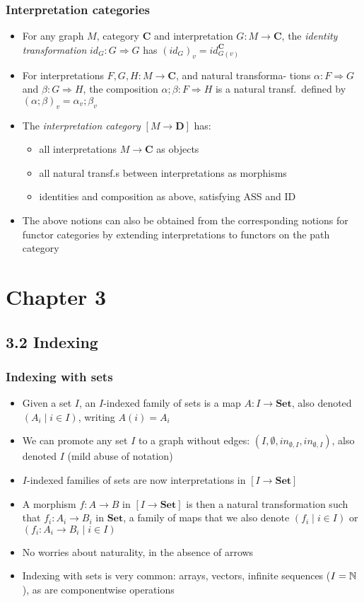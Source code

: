 \documentclass[handout]{beamer}
\newcommand{\To}{\Rightarrow}
\newcommand{\bfsf}[1]{{\boldsymbol{#1}}}
\newcommand{\Set}{\bfsf{Set}}
\newcommand{\CC}{\bfsf{C}}
\newcommand{\DD}{\bfsf{D}}
\begin{document}
\frame
  {   
    \frametitle{Interpretation categories}\label{Ch3:interpretationcats}

 \begin{itemize}[<+->]
\item For any graph $M$,  category $\CC$ and interpretation $G: M\to\CC$, the 
\emph{identity transformation} $id_G : G\To G$ has $(id_G)_v = id^\CC_{G(v)}$
\item For interpretations $F,G,H: M\to\CC$, and natural
transforma- tions $\alpha: F\To G$ and $\beta:G\To H$, the composition
$\alpha;\beta: F\To H$ is a natural transf.\ defined by 
$(\alpha;\beta)_v= \alpha_v;\beta_v$
 \item The \emph{interpretation category} $[M\to\DD]$ has:
   \begin{itemize}[<+->]
\item all interpretations $M\to\CC$ as objects 
\item all natural transf.s  between interpretations as morphisms 
\item identities and composition as above, satisfying ASS and ID
   \end{itemize}
\item The above notions can also be obtained from the corresponding
notions for functor categories by extending interpretations
to functors on the path category
 \end{itemize}

 }


\section{Chapter 3}
\subsection{3.2 Indexing}

\frame
  {   
    \frametitle{Indexing with sets}\label{Ch3:indexset}

 \begin{itemize}[<+->]
\item Given a set $I$, an $I$-indexed family of sets is a map $A : I\to \Set$,
also denoted $(A_i \mid i\in I)$,  writing $A(i)=A_i$
\item We can promote any set $I$ to a graph without edges: 
$(I,\emptyset,in_{\emptyset,I},in_{\emptyset,I})$, also denoted $I$ (mild abuse of notation)
 \item $I$-indexed families of sets are now interpretations in $[I\to \Set]$
 \item A morphism $f: A\to B$ in $[I\to \Set]$ is then a natural transformation
such that $f_i: A_i \to B_i$ in $\Set$, a family of maps that we also denote
$(f_i \mid i\in I)$ or $(f_i: A_i\to B_i \mid i\in I)$
\item No worries about naturality, in the absence of arrows
\item Indexing with sets is very common: arrays, vectors, infinite sequences ($I=\mathbb{N}$),
as are componentwise operations
 \end{itemize}

 }
\end{document}

